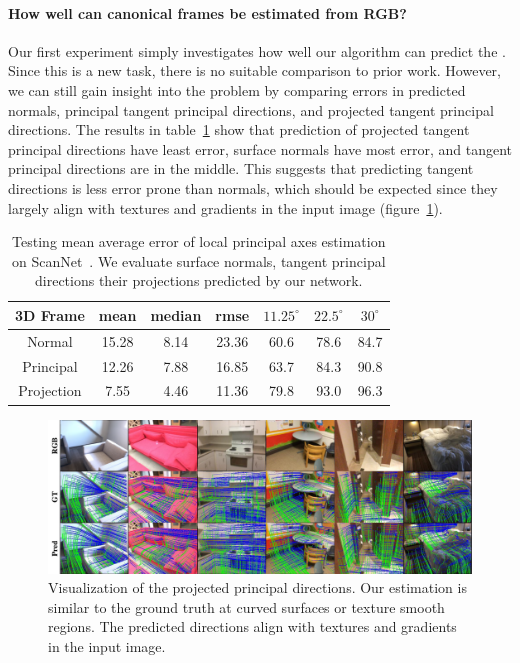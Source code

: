 \vspace{-0.1in}
\paragraph{How well can canonical frames be estimated from RGB?}  Our first experiment simply investigates how well our algorithm can predict the \cframe{}.   Since this is a new task, there is no suitable comparison to prior work.   However, we can still gain insight into the problem by comparing errors in predicted normals, principal tangent principal directions, and projected tangent principal directions.   The results in table~\ref{tab:framenet-3dframe} show that prediction of projected tangent principal directions have least error, surface normals have most error, and tangent principal directions are in the middle.   This suggests that predicting tangent directions is less error prone than normals, which should be expected since they largely align with textures and gradients in the input image (figure~\ref{fig:framenet-project}). 

\begin{table}[t]
    \centering
    \small
    \tabcolsep=0.12cm
    \begin{tabular}{|c|c|c|c||c|c|c|}
        \hline
         \textbf{3D Frame} & mean & median & rmse & $11.25^\circ$ & $22.5^\circ$ & $30^\circ$\\
         \hline
         Normal & 15.28 & 8.14 & 23.36 & 60.6 & 78.6 & 84.7\\
         \hline
         Principal & 12.26 & 7.88 & 16.85 & 63.7 & 84.3 & 90.8\\
         \hline
         Projection & 7.55 & 4.46 & 11.36 & 79.8 & 93.0 & 96.3\\
         \hline
    \end{tabular}
    \caption{Testing mean average error of local principal axes estimation on ScanNet~\cite{dai2017scannet}. We evaluate surface normals, tangent principal directions their projections predicted by our network.}
    \label{tab:framenet-3dframe}
\end{table}

\begin{figure}[t]
    \centering
    \includegraphics[width=\linewidth]{FrameNet/graph/result-ours.pdf}
    \caption{Visualization of the projected principal directions. Our estimation is similar to the ground truth at curved surfaces or texture smooth regions. The predicted directions align with textures and gradients in the input image.}
    \label{fig:framenet-project}
\end{figure}

